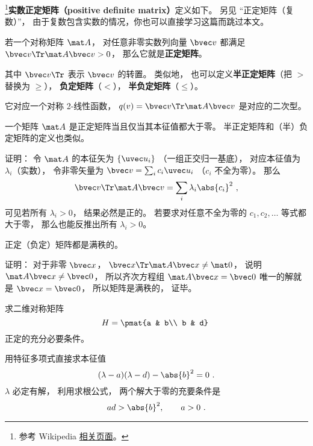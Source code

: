

\footnote{参考 Wikipedia \href{https://en.wikipedia.org/wiki/Definite_matrix}{相关页面}。}\textbf{实数正定矩阵（positive definite matrix）}定义如下。 另见 “正定矩阵（复数）”， 由于复数包含实数的情况，你也可以直接学习这篇而跳过本文。
\begin{definition}{}
若一个对称矩阵 $\mat A$， 对任意非零实数列向量 $\bvec v$ 都满足 $\bvec v\Tr \mat A \bvec v > 0$， 那么它就是\textbf{正定矩阵}。
\end{definition}
其中 $\bvec v\Tr$ 表示 $\bvec v$ 的转置。 类似地， 也可以定义\textbf{半正定矩阵}（把 $>$ 替换为 $\geqslant$）， \textbf{负定矩阵}（$<$）， \textbf{半负定矩阵}（$\leqslant$）。

它对应一个对称 2-线性函数， $q(v) = \bvec v\Tr \mat A \bvec v$ 是对应的二次型。

\begin{theorem}{}
一个矩阵 $\mat A$ 是正定矩阵当且仅当其本征值都大于零。 半正定矩阵和（半）负定矩阵的定义也类似。
\end{theorem}

证明： 令 $\mat A$ 的本征矢为 $\{\uvec u_i\}$ （一组正交归一基底）， 对应本征值为 $\lambda_i$（实数）， 令非零矢量为 $\bvec v = \sum_i c_i \uvec u_i$ （$c_i$ 不全为零）。 那么
\begin{equation}
\bvec v\Tr \mat A \bvec v = \sum_i \lambda_i \abs{c_i}^2~,
\end{equation}
可见若所有 $\lambda_i > 0$， 结果必然是正的。 若要求对任意不全为零的 $c_1,c_2,\dots$ 等式都大于零， 那么也能反推出所有 $\lambda_i > 0$。

\begin{theorem}{}
正定（负定）矩阵都是满秩的。
\end{theorem}
证明： 对于非零 $\bvec x$， $\bvec x\Tr \mat A \bvec x \ne \mat 0$， 说明 $\mat A\bvec x \ne \bvec 0$， 所以齐次方程组 $\mat A\bvec x = \bvec 0$ 唯一的解就是 $\bvec x = \bvec 0$， 所以矩阵是满秩的， 证毕。

\begin{example}{}
求二维对称矩阵
\begin{equation}
H = \pmat{a & b\\ b & d}~
\end{equation}
正定的充分必要条件。

用特征多项式直接求本征值
\begin{equation}
(\lambda - a)(\lambda - d) - \abs{b}^2 = 0~.
\end{equation}
$\lambda$ 必定有解， 利用求根公式， 两个解大于零的充要条件是
\begin{equation}
ad > \abs{b}^2, \qquad
a > 0~.
\end{equation}
\end{example}

